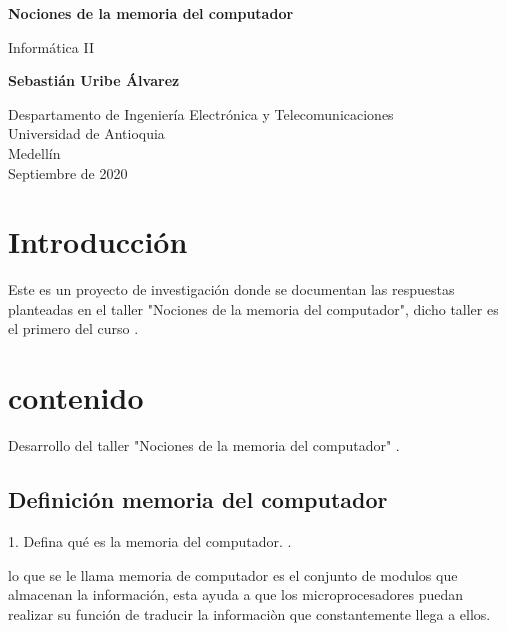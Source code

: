 \documentclass{article}
\begin{document}
\begin{titlepage}
    \begin{center}
        \vspace*{1cm}
            
        \Huge
        \textbf{Nociones de la memoria del computador}
            
        \vspace{0.5cm}
        \LARGE
        Informática II
            
        \vspace{1.5cm}
            
        \textbf{Sebastián Uribe Álvarez}
            
        \vfill
            
        \vspace{0.8cm}
            
        \Large
        Despartamento de Ingeniería Electrónica y Telecomunicaciones\\
        Universidad de Antioquia\\
        Medellín\\
        Septiembre de 2020
            
    \end{center}
\end{titlepage}

\tableofcontents

\section{Introducción}\label{Introducción}
Este es un proyecto de investigación donde se documentan las respuestas planteadas en el taller "Nociones de la memoria del computador", dicho taller es el primero del curso .

\section{contenido} \label{contenido}

Desarrollo del taller "Nociones de la memoria del computador"
. \cite{refer}


\subsection{Definición memoria del computador}\label{memo}

1. Defina qué es la memoria del computador.
. \cite{refer}

lo que se le llama memoria de computador 
es el conjunto de modulos que almacenan 
la información, esta ayuda a que los microprocesadores puedan realizar su función de traducir la informaciòn que constantemente llega a ellos.
\end{document}

